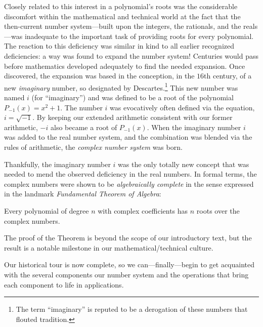 Closely related to this interest in a polynomial's roots was the
considerable discomfort within the mathematical and technical world at
the fact that the then-current number system---built upon the
integers, the rationals, and the reals---was inadequate to the
important task of providing roots for every polynomial.  The reaction
to this deficiency was similar in kind to all earlier recognized
deficiencies: a way was found to expand the number system!  Centuries
would pass before mathematics developed adequately to find the needed
expansion.  Once discovered, the expansion was based in the
conception, in the $16$th century, of a new {\it imaginary} number,
 so designated by 
Descartes.\footnote{The term ``imaginary'' is reputed to be a
  derogation of these numbers that flouted tradition.}  This new
number was named $i$ 
 (for ``imaginary'') and was defined to
be a root of the polynomial $P_{-1}(x) = x^2 +1$.  The number $i$ was
evocatively often defined via the equation, $i = \sqrt{-1}$.  By
keeping our extended arithmetic consistent with our former arithmetic,
$-i$ also became a root of $P_{-1}(x)$.  When the imaginary number $i$
was added to the real number system, and the combination was blended
via the rules of arithmetic, the {\it complex number
  system} was born.

Thankfully, the imaginary number $i$ was the only totally new concept
that was needed to mend the observed deficiency in the real numbers.
In formal terms, the complex numbers were shown to be {\it
  algebraically complete}  in the sense expressed in the landmark {\it Fundamental
  Theorem of Algebra}: 

\begin{theorem}
Every polynomial of degree $n$ with complex coefficients has $n$ roots
over the complex numbers.
\end{theorem}

The proof of the Theorem is beyond the scope of our introductory text,
but the result is a notable milestone in our mathematical/technical
culture.

\medskip

Our historical tour is now complete, so we can---finally---begin to
get acquainted with the several components our number system and the operations that bring
each component to life in applications.

